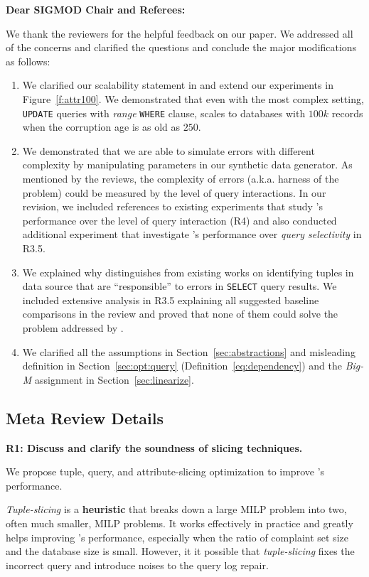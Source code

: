 \noindent \textbf{Dear SIGMOD Chair and Referees:}

We thank the reviewers for the helpful feedback on our paper. We addressed all of the concerns and clarified the questions and conclude the major modifications as follows:
\begin{enumerate}
\item We clarified our scalability statement in and extend our experiments in Figure~\ref{f:attr100}. We demonstrated that even with the most complex setting, \texttt{UPDATE} queries with \textit{range} \texttt{WHERE} clause, \sys scales to databases with $100k$ records when the corruption age is as old as $250$. 
\item We demonstrated that we are able to simulate errors with different complexity by manipulating parameters in our synthetic data generator. As mentioned by the reviews, the complexity of errors (a.k.a. harness of the problem) could be measured by the level of query interactions. In our revision, we included references to existing experiments that study \sys's performance over the level of query interaction (R4) and also conducted additional experiment that investigate \sys's performance over \textit{query selectivity} in R3.5. 
\item We explained why \sys distinguishes from existing works on identifying tuples in data source that are ``responsible'' to errors in \texttt{SELECT} query results. We included extensive analysis in R3.5 explaining all suggested baseline comparisons in the review and proved that none of them could solve the problem addressed by \sys. 
\item We clarified all the assumptions in Section~\ref{sec:abstractions} and misleading definition in Section~\ref{sec:opt:query} (Definition~\ref{eq:dependency}) and the \textit{Big-M} assignment in Section~\ref{sec:linearize}.
\end{enumerate}

\subsection*{Meta Review Details}
\noindent \textbf{R1: Discuss and clarify the soundness of slicing techniques.} 

We propose tuple, query, and attribute-slicing optimization to improve \sys's performance. 

\emph{Tuple-slicing} is a \textbf{heuristic} that breaks down a large MILP problem into two, often much smaller, MILP problems. It works effectively in practice and greatly helps improving \sys's performance, especially when the ratio of complaint set size and the database size is small. However, it it possible that \emph{tuple-slicing} fixes the incorrect query and introduce noises to the query log repair. 

